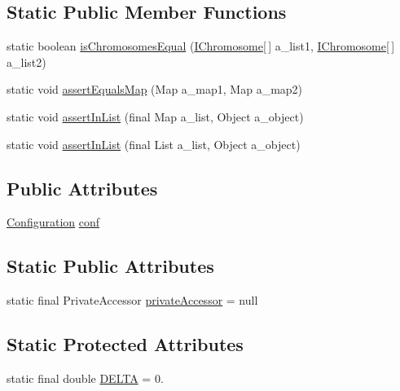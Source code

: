 \subsection*{Static Public Member Functions}
\begin{DoxyCompactItemize}
\item 
static boolean \hyperlink{classorg_1_1jgap_1_1_j_g_a_p_test_case_a4f484987731cdc5276ee2575a165fcf3}{is\-Chromosomes\-Equal} (\hyperlink{interfaceorg_1_1jgap_1_1_i_chromosome}{I\-Chromosome}\mbox{[}$\,$\mbox{]} a\-\_\-list1, \hyperlink{interfaceorg_1_1jgap_1_1_i_chromosome}{I\-Chromosome}\mbox{[}$\,$\mbox{]} a\-\_\-list2)
\item 
static void \hyperlink{classorg_1_1jgap_1_1_j_g_a_p_test_case_a3ccc244fd7637efacc27641a3b4bac99}{assert\-Equals\-Map} (Map a\-\_\-map1, Map a\-\_\-map2)
\item 
static void \hyperlink{classorg_1_1jgap_1_1_j_g_a_p_test_case_a0f7793db6d254be9753ed623ae09653b}{assert\-In\-List} (final Map a\-\_\-list, Object a\-\_\-object)
\item 
static void \hyperlink{classorg_1_1jgap_1_1_j_g_a_p_test_case_a2b9df927cb9282d81abfd7daf6407416}{assert\-In\-List} (final List a\-\_\-list, Object a\-\_\-object)
\end{DoxyCompactItemize}
\subsection*{Public Attributes}
\begin{DoxyCompactItemize}
\item 
\hyperlink{classorg_1_1jgap_1_1_configuration}{Configuration} \hyperlink{classorg_1_1jgap_1_1_j_g_a_p_test_case_a2f976f156a2ab015f30f0828671764e1}{conf}
\end{DoxyCompactItemize}
\subsection*{Static Public Attributes}
\begin{DoxyCompactItemize}
\item 
static final Private\-Accessor \hyperlink{classorg_1_1jgap_1_1_j_g_a_p_test_case_a32462e38877d88fea7d7aad0538a42bd}{private\-Accessor} = null
\end{DoxyCompactItemize}
\subsection*{Static Protected Attributes}
\begin{DoxyCompactItemize}
\item 
static final double \hyperlink{classorg_1_1jgap_1_1_j_g_a_p_test_case_a9526215e5c49deb8f2811944f050d30b}{D\-E\-L\-T\-A} = 0.
\end{DoxyCompactItemize}
